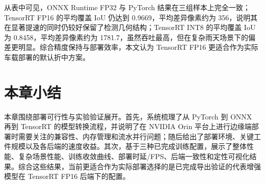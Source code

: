 从表中可见，ONNX Runtime FP32 与 PyTorch 结果在三组样本上完全一致；TensorRT FP16 的平均覆盖 IoU 仍达到 0.9669，平均差异像素约为 356，说明其在显著提速的同时仍较好保留了检测几何结构；TensorRT INT8 的平均覆盖 IoU 为 0.8458，平均差异像素约为 1781.7，虽然吞吐最高，但在复杂雨天场景下的偏差更明显。综合精度保持与部署效率，本文认为 TensorRT FP16 更适合作为实际车载部署的默认折中方案。

\section{本章小结}
\label{sec:discussion_summary}

本章围绕部署可行性与实验验证展开。首先，系统梳理了从 PyTorch 到 ONNX 再到 TensorRT 的模型转换流程，并说明了在 NVIDIA Orin 平台上进行边缘端部署时需要关注的兼容性、内存管理和流水并行问题；随后给出了部署环境、关键工件规模以及各后端的速度收益。其次，基于三种已完成训练配置，展示了整体性能、复杂场景性能、训练收敛曲线、部署时延/FPS、后端一致性和定性可视化结果。综合这些结果，当前更适合作为实际部署选择的是已完成导出验证的代表增强模型在 TensorRT FP16 后端下的配置。
